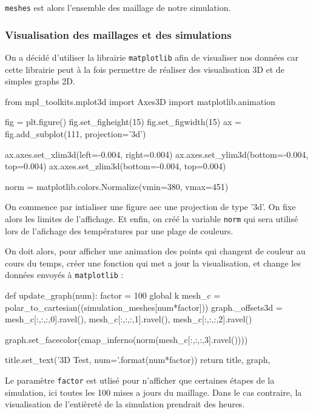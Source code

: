 \documentclass[fleqn]{article}
\begin{document}
\texttt{meshes} est alors l'ensemble des maillage de notre simulation.

\subsubsection{Visualisation des maillages et des simulations}
On a décidé d'utiliser la librairie \texttt{matplotlib} afin de visualiser nos données car cette librairie peut à la fois permettre de réaliser des visualisation 3D et de simples graphs 2D.

\begin{python}
    from mpl_toolkits.mplot3d import Axes3D
    import matplotlib.animation

    fig = plt.figure()
    fig.set_figheight(15)
    fig.set_figwidth(15)
    ax = fig.add_subplot(111, projection='3d')

    ax.axes.set_xlim3d(left=-0.004, right=0.004) 
    ax.axes.set_ylim3d(bottom=-0.004, top=0.004)
    ax.axes.set_zlim3d(bottom=-0.004, top=0.004)

    norm = matplotlib.colors.Normalize(vmin=380, vmax=451)
\end{python}

On commence par intialiser une figure aec une projection de type '3d'. On fixe alors les limites de l'affichage. Et enfin, on créé la variable \texttt{norm} qui sera utilisé lors de l'afichage des températures par une plage de couleurs.

On doit alors, pour afficher une animation des points qui changent de couleur au cours du temps, créer une fonction qui met a jour la visualisation, et change les données envoyés à \texttt{matplotlib} :
\begin{python}
    def update_graph(num):
        factor = 100
        global k
        mesh_c = polar_to_cartesian((simulation_meshes[num*factor]))
        graph._offsets3d = mesh_c[:,:,:,0].ravel(), mesh_c[:,:,:,1].ravel(), mesh_c[:,:,:,2].ravel()
        
        graph.set_facecolor(cmap_inferno(norm(mesh_c[:,:,:,3].ravel())))
            
        title.set_text('3D Test, num={}'.format(num*factor))
        return title, graph, 
\end{python}

Le paramètre \texttt{factor} est utlisé pour n'afficher que certaines étapes de la simulation, ici toutes les 100 mises a jours du maillage. Dans le cas contraire, la visualisation de l'entièreté de la simulation prendrait des heures.
\end{document}
